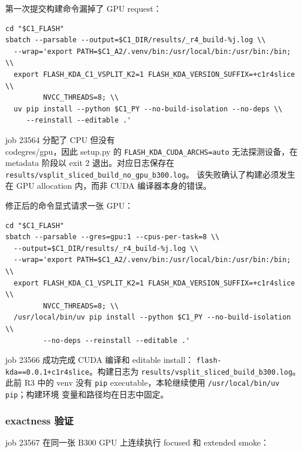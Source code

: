 \documentclass[11pt,a4paper,fontset=none]{ctexart}
\newcommand{\code}[1]{\texttt{#1}}
\begin{document}
第一次提交构建命令漏掉了 GPU request：

\begin{lstlisting}
cd "$C1_FLASH"
sbatch --parsable --output=$C1_DIR/results/_r4_build-%j.log \\
  --wrap='export PATH=$C1_A2/.venv/bin:/usr/local/bin:/usr/bin:/bin; \\
  export FLASH_KDA_C1_VSPLIT_K2=1 FLASH_KDA_VERSION_SUFFIX=+c1r4slice \\
         NVCC_THREADS=8; \\
  uv pip install --python $C1_PY --no-build-isolation --no-deps \\
     --reinstall --editable .'
\end{lstlisting}

job 23564 分配了 CPU 但没有 \\code{gres/gpu}，因此 setup.py 的
\code{FLASH\_KDA\_CUDA\_ARCHS=auto} 无法探测设备，在 metadata 阶段以 exit 2
退出。对应日志保存在 \code{results/vsplit\_sliced\_build\_no\_gpu\_b300.log}。
该失败确认了构建必须发生在 GPU allocation 内，而非 CUDA 编译器本身的错误。

修正后的命令显式请求一张 GPU：

\begin{lstlisting}
cd "$C1_FLASH"
sbatch --parsable --gres=gpu:1 --cpus-per-task=8 \\
  --output=$C1_DIR/results/_r4_build-%j.log \\
  --wrap='export PATH=$C1_A2/.venv/bin:/usr/local/bin:/usr/bin:/bin; \\
  export FLASH_KDA_C1_VSPLIT_K2=1 FLASH_KDA_VERSION_SUFFIX=+c1r4slice \\
         NVCC_THREADS=8; \\
  /usr/local/bin/uv pip install --python $C1_PY --no-build-isolation \\
         --no-deps --reinstall --editable .'
\end{lstlisting}

job 23566 成功完成 CUDA 编译和 editable install：
\code{flash-kda==0.0.1+c1r4slice}。构建日志为
\code{results/vsplit\_sliced\_build\_b300.log}。此前 R3 中的 venv 没有
\code{pip} executable，本轮继续使用 \code{/usr/local/bin/uv pip}；构建环境
变量和路径均在日志中固定。

\subsubsection{exactness 验证}

job 23567 在同一张 B300 GPU 上连续执行 focused 和 extended smoke：
\end{document}
